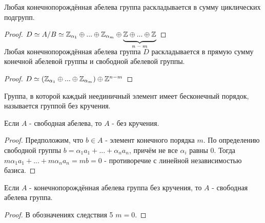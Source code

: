 \begin{consequensenum}
    Любая конечнопорождённая абелева группа раскладывается в сумму циклических подгрупп.
\end{consequensenum}
\begin{proof}
    $D \simeq A/B \simeq \Z_{\alpha_1} \oplus ... \oplus \Z_{\alpha_m} \oplus \undermat{n-m}{\Z\oplus ... \oplus \Z}\\$
\end{proof}
\begin{consequensenum}
    Любая конечнопорождённая абелева группа $D$ раскладывается в прямую сумму конечной абелевой группы и свободной абелевой группы. 
\end{consequensenum}
\begin{proof}
    $D \simeq (\mathbb{Z}_{\alpha_1} \oplus ... \oplus \mathbb{Z}_{\alpha_m}) \oplus \mathbb{Z}^{n-m}$
\end{proof}
\begin{definition}
    Группа, в которой каждый неединичный элемент имеет бесконечный порядок, называется группой без кручения.
\end{definition}
\begin{exercise}
    Если $A$ - свободная абелева, то $A$ - без кручения.
\end{exercise}
\begin{proof}
    Предположим, что $b \in A$ - элемент конечного порядка $m$. По определению свободной группы $b = \alpha_1a_1 + ... + \alpha_na_n$, причём не все $\alpha_i$ равны 0. Тогда $m\alpha_1a_1 + ... + m\alpha_na_n = mb = 0$ - противоречие с линейной независимостью базиса.
\end{proof}
\begin{consequensenum}
    Если $A$ - конечнопорождённая абелева группа без кручения, то $A$ - свободная абелева группа.
\end{consequensenum}
\begin{proof}
    В обозначениях следствия 5 $m = 0$.
\end{proof}